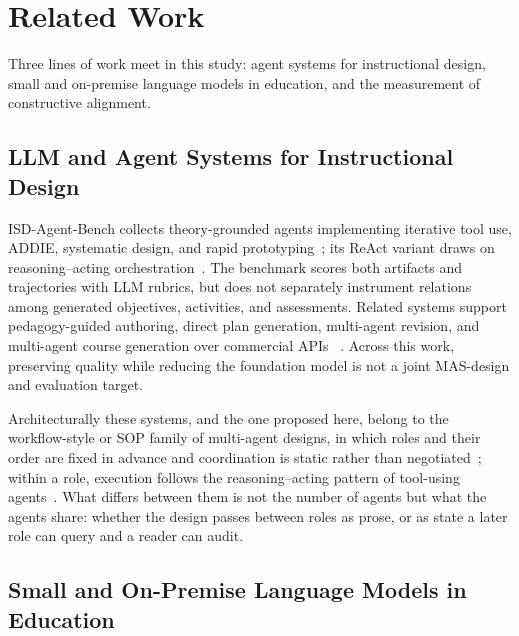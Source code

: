 \section{Related Work}
\label{sec:related-work}

Three lines of work meet in this study: agent systems for instructional design,
small and on-premise language models in education, and the measurement of
constructive alignment.

\subsection{LLM and Agent Systems for Instructional Design}

ISD-Agent-Bench collects theory-grounded agents implementing iterative tool use,
ADDIE, systematic design, and rapid prototyping~\cite{isdagentbench}; its ReAct
variant draws on reasoning--acting orchestration~\cite{yao2023react}. The benchmark
scores both artifacts and trajectories with LLM rubrics, but does not separately
instrument relations among generated objectives, activities, and assessments.
Related systems support pedagogy-guided authoring, direct plan generation,
multi-agent revision, and multi-agent course generation over commercial APIs
~\cite{lessonplanner2024,hu2024teachingplan,zhang2025eduplanner,
yao2025instructionalagents}. Across this work, preserving quality while reducing
the foundation model is not a joint MAS-design and evaluation target.

Architecturally these systems, and the one proposed here, belong to the
workflow-style or SOP family of multi-agent designs, in which roles and their order
are fixed in advance and coordination is static rather than
negotiated~\cite{hong2024metagpt}; within a role, execution follows the
reasoning--acting pattern of tool-using agents~\cite{yao2023react}. What differs
between them is not the number of agents but what the agents share: whether the
design passes between roles as prose, or as state a later role can query and a
reader can audit.

\subsection{Small and On-Premise Language Models in Education}

